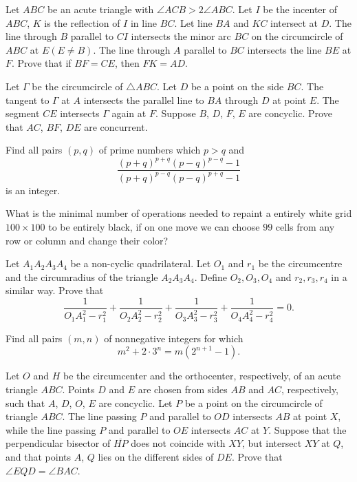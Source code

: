 \documentclass[11pt]{scrartcl}
\begin{document}
\begin{problem}[156060759856343521]
Let $ABC$ be an acute triangle with $\angle ACB>2 \angle ABC$. Let $I$ be the incenter of $ABC$, $K$ is the reflection of $I$ in line $BC$. Let line $BA$ and $KC$ intersect at $D$. The line through $B$ parallel to $CI$ intersects the minor arc $BC$ on the circumcircle of $ABC$ at $E(E \neq B)$. The line through $A$ parallel to $BC$ intersects the line $BE$ at $F$.
Prove that if $BF=CE$, then $FK=AD$.
\end{problem}
\begin{problem}[236318831875052]
	Let $\Gamma$ be the circumcircle of $\triangle ABC$. Let $D$ be a point on the side $BC$. The tangent to $\Gamma$ at $A$ intersects the parallel line to $BA$ through $D$ at point $E$. The segment $CE$ intersects $\Gamma$ again at $F$. Suppose $B$, $D$, $F$, $E$ are concyclic. Prove that $AC$, $BF$, $DE$ are concurrent.
\end{problem}
\begin{problem}[574687232505662]
	Find all pairs $(p,q)$ of prime numbers which $p>q$ and
$$\frac{(p+q)^{p+q}(p-q)^{p-q}-1}{(p+q)^{p-q}(p-q)^{p+q}-1}$$is an integer.
\end{problem}
\begin{problem}[549441013338848]
	What is the minimal number of operations needed to repaint a entirely white grid $100 \times 100$ to be entirely black, if on one move we can choose $99$ cells from any row or column and change their color?
\end{problem}
\begin{problem}[307733682720311]
	Let $A_1A_2A_3A_4$ be a non-cyclic quadrilateral. Let $O_1$ and $r_1$ be the circumcentre and the circumradius of the triangle $A_2A_3A_4$. Define $O_2,O_3,O_4$ and $r_2,r_3,r_4$ in a similar way. Prove that
\[\frac{1}{O_1A_1^2-r_1^2}+\frac{1}{O_2A_2^2-r_2^2}+\frac{1}{O_3A_3^2-r_3^2}+\frac{1}{O_4A_4^2-r_4^2}=0.\]
\end{problem}
\begin{problem}[6254579538196178032]
Find all pairs $(m,n)$ of nonnegative integers for which\[m^2 + 2 \cdot 3^n = m\left(2^{n+1} - 1\right).\]
\end{problem}
\begin{problem}[457324036151847]
Let $O$ and $H$ be the circumcenter and the orthocenter, respectively, of an acute triangle $ABC$. Points $D$ and $E$ are chosen from sides $AB$ and $AC$, respectively, such that $A$, $D$, $O$, $E$ are concyclic. Let $P$ be a point on the circumcircle of triangle $ABC$. The line passing $P$ and parallel to $OD$ intersects $AB$ at point $X$, while the line passing $P$ and parallel to $OE$ intersects $AC$ at $Y$. Suppose that the perpendicular bisector of $\overline{HP}$ does not coincide with $XY$, but intersect $XY$ at $Q$, and that points $A$, $Q$ lies on the different sides of $DE$. Prove that $\angle EQD = \angle BAC$.
\end{problem}
\end{document}
